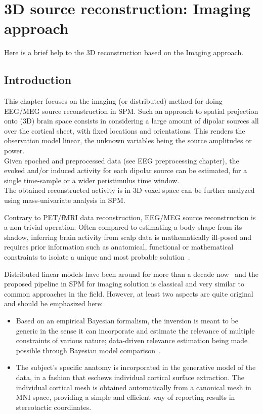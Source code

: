 \chapter{3D source reconstruction: Imaging approach \label{Chap:eeg:imaging}}

Here is a brief help to the 3D reconstruction based on the Imaging approach.

\section{Introduction}
\label{sec:imaginv_intro}
This chapter focuses on the imaging (or distributed) method for doing 
EEG/MEG source reconstruction in SPM.
Such an approach to spatial projection onto (3D) brain space consists
in considering a large amount of dipolar sources all over the cortical sheet, 
with fixed locations and orientations. This renders the observation model linear, 
the unknown variables being the source amplitudes or power.\\
Given epoched and preprocessed data (see EEG preprocessing chapter), the evoked and/or induced
activity for each dipolar source can be estimated, for a single time-sample or a 
wider peristimulus time window.\\
The obtained reconstructed activity is in 3D voxel space can be further analyzed using mass-univariate
analysis in SPM.

Contrary to PET/fMRI data reconstruction, EEG/MEG source reconstruction 
is a non trivial operation. Often compared to estimating a body shape from 
its shadow, inferring brain activity from scalp data is mathematically ill-posed 
and requires prior information such as anatomical, functional or mathematical
constraints to isolate a unique and most probable solution~\cite{Baillet01}.

Distributed linear models have been around for more than a decade now~\cite{Dale93}
and the proposed pipeline in SPM for imaging solution is classical and very similar
to common approaches in the field. However, at least two aspects are quite original 
and should be emphasized here:

\begin{itemize}
\item Based on an empirical Bayesian formalism, the inversion is meant 
to be generic in the sense it can incorporate and estimate the relevance
of multiple constraints of various nature; data-driven relevance estimation 
being made possible through Bayesian model 
comparison~\cite{peb1,cp_empirical_eeg,jm_multiple,karl_induced}.
\item The subject's specific anatomy is incorporated in the generative model
of the data, in a fashion that eschews individual cortical surface extraction.
The individual cortical mesh is obtained automatically from a canonical mesh in 
MNI space, providing a simple and efficient way of reporting results in stereotactic coordinates.
\end{itemize}

